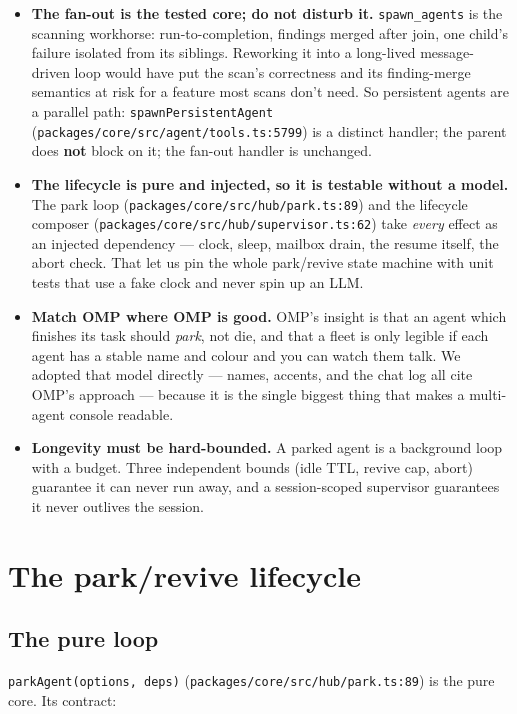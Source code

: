 \documentclass[11pt]{article}
\begin{document}
\begin{itemize}[leftmargin=*]
  \item \textbf{The fan-out is the tested core; do not disturb it.}
  \texttt{spawn\_agents} is the scanning workhorse: run-to-completion, findings
  merged after join, one child's failure isolated from its siblings. Reworking it
  into a long-lived message-driven loop would have put the scan's correctness and
  its finding-merge semantics at risk for a feature most scans don't need. So
  persistent agents are a parallel path: \texttt{spawnPersistentAgent}
  (\texttt{packages/core/src/agent/tools.ts:5799}) is a distinct handler; the
  parent does \textbf{not} block on it; the fan-out handler is unchanged.
  \item \textbf{The lifecycle is pure and injected, so it is testable without a
  model.} The park loop (\texttt{packages/core/src/hub/park.ts:89}) and the
  lifecycle composer (\texttt{packages/core/src/hub/supervisor.ts:62}) take
  \textit{every} effect as an injected dependency --- clock, sleep, mailbox drain,
  the resume itself, the abort check. That let us pin the whole park/revive state
  machine with unit tests that use a fake clock and never spin up an LLM.
  \item \textbf{Match OMP where OMP is good.} OMP's insight is that an agent which
  finishes its task should \textit{park}, not die, and that a fleet is only legible
  if each agent has a stable name and colour and you can watch them talk. We
  adopted that model directly --- names, accents, and the chat log all cite OMP's
  approach --- because it is the single biggest thing that makes a multi-agent
  console readable.
  \item \textbf{Longevity must be hard-bounded.} A parked agent is a background
  loop with a budget. Three independent bounds (idle TTL, revive cap, abort)
  guarantee it can never run away, and a session-scoped supervisor guarantees it
  never outlives the session.
\end{itemize}

\section{The park/revive lifecycle}

\subsection{The pure loop}

\texttt{parkAgent(options, deps)} (\texttt{packages/core/src/hub/park.ts:89}) is
the pure core. Its contract:
\end{document}
